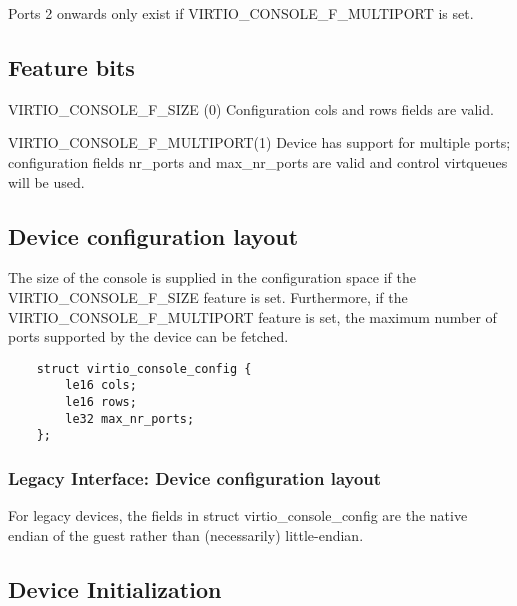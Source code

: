   Ports 2 onwards only exist if VIRTIO_CONSOLE_F_MULTIPORT is set.

\subsection{Feature bits}\label{sec:Device Types / Console Device / Feature bits}

  VIRTIO_CONSOLE_F_SIZE (0) Configuration cols and rows fields
    are valid.

  VIRTIO_CONSOLE_F_MULTIPORT(1) Device has support for multiple
    ports; configuration fields nr_ports and max_nr_ports are
    valid and control virtqueues will be used.

\subsection{Device configuration layout}\label{sec:Device Types / Console Device / Device configuration layout}

  The size of the console is supplied
  in the configuration space if the VIRTIO_CONSOLE_F_SIZE feature
  is set. Furthermore, if the VIRTIO_CONSOLE_F_MULTIPORT feature
  is set, the maximum number of ports supported by the device can
  be fetched.

\begin{lstlisting}
	struct virtio_console_config {
		le16 cols;
		le16 rows;
		le32 max_nr_ports;
	};
\end{lstlisting}

\subsubsection{Legacy Interface: Device configuration layout}\label{sec:Device Types / Console Device / Device configuration layout / Legacy Interface: Device configuration layout}
For legacy devices, the fields in struct virtio_console_config are the
native endian of the guest rather than (necessarily) little-endian.

\subsection{Device Initialization}\label{sec:Device Types / Console Device / Device Initialization}

